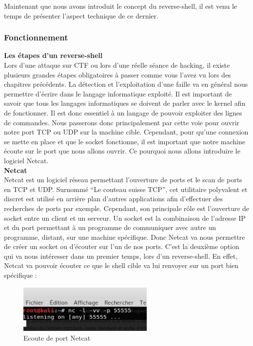 Maintenant que nous avons introduit le concept du reverse-shell, il est venu le temps de présenter l’aspect technique de ce dernier.

\subsubsection{Fonctionnement}

\noindent \textbf{Les étapes d'un reverse-shell}\\

Lors d’une attaque sur CTF ou lors d’une réelle séance de hacking, il existe plusieurs grandes étapes obligatoires à passer comme vous l’avez vu lors des chapitres précédents. La détection et l’exploitation d’une faille va en général nous permettre d’écrire dans le langage informatique exploité. Il est important de savoir que tous les langages informatiques se doivent de parler avec le kernel afin de fonctionner. Il est donc essentiel à un langage de pouvoir exploiter des lignes de commandes. Nous passerons donc principalement par cette voie pour ouvrir notre port TCP ou UDP sur la machine cible. Cependant, pour qu’une connexion se mette en place et que le socket fonctionne, il est important que notre machine écoute sur le port que nous allons ouvrir. Ce pourquoi nous allons introduire le logiciel Netcat.\\

\noindent \textbf{Netcat}\\

Netcat est un logiciel réseau permettant l’ouverture de ports et le scan de ports en TCP et UDP. Surnommé “Le couteau suisse TCP”,  cet utilitaire polyvalent et discret est utilisé en arrière plan d’autres applications afin d’effectuer des recherches de ports par exemple. Cependant, son  principale rôle est l’ouverture de socket entre un client et un serveur.
Un socket est la combinaison de l’adresse IP et du port permettant à un programme de communiquer avec autre un programme, distant, sur une machine spécifique. 
Donc Netcat va nous permettre de créer un socket ou d’écouter sur l’un de nos ports. C’est la deuxième option qui va nous intéresser dans un premier temps, lors d’un reverse-shell. En effet, Netcat va pouvoir écouter ce que le shell cible va lui renvoyer sur un port bien spécifique :

\begin{figure}[htp!]
  \centering
  \setlength\figureheight{7cm}
  \setlength\figurewidth{9cm}
  \includegraphics[width=0.6\textwidth]{oui/Ancien/imangeancien/Reverse-Shell/netcat_lvp.PNG}
  \caption{Ecoute de port Netcat}
  \label{fig:courbe-tikz}
\end{figure}

